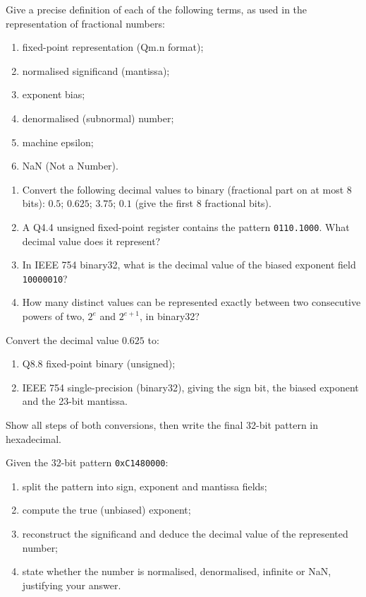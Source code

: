 \documentclass[11pt]{article}
\newcounter{popsec}
\newcounter{popsub}
\newcommand{\courssub}[1]{%
  \stepcounter{popsub}%
  \par\vspace{9pt}\noindent{\popxbold\fontsize{11.5}{13}\selectfont\color{popink}{\color{poporange}\thepopsec.\thepopsub}\hspace{6pt}#1}\par\nopagebreak\vspace{4pt}
}
\begin{document}
\begin{exercice}
Give a precise definition of each of the following terms, as used in the representation of fractional numbers:
\begin{enumerate}
\item fixed-point representation (Qm.n format);
\item normalised significand (mantissa);
\item exponent bias;
\item denormalised (subnormal) number;
\item machine epsilon;
\item NaN (Not a Number).
\end{enumerate}
\end{exercice}

\begin{exercice}
\begin{enumerate}
\item Convert the following decimal values to binary (fractional part on at most 8 bits): $0.5$; $0.625$; $3.75$; $0.1$ (give the first 8 fractional bits).
\item A Q4.4 unsigned fixed-point register contains the pattern \texttt{0110.1000}. What decimal value does it represent?
\item In IEEE 754 binary32, what is the decimal value of the biased exponent field \texttt{10000010}?
\item How many distinct values can be represented exactly between two consecutive powers of two, $2^e$ and $2^{e+1}$, in binary32?
\end{enumerate}
\end{exercice}

\courssub{I practise}

\begin{exercice}
Convert the decimal value $0.625$ to:
\begin{enumerate}
\item Q8.8 fixed-point binary (unsigned);
\item IEEE 754 single-precision (binary32), giving the sign bit, the biased exponent and the 23-bit mantissa.
\end{enumerate}
Show all steps of both conversions, then write the final 32-bit pattern in hexadecimal.
\end{exercice}

\begin{exercice}
Given the 32-bit pattern \texttt{0xC1480000}:
\begin{enumerate}
\item split the pattern into sign, exponent and mantissa fields;
\item compute the true (unbiased) exponent;
\item reconstruct the significand and deduce the decimal value of the represented number;
\item state whether the number is normalised, denormalised, infinite or NaN, justifying your answer.
\end{enumerate}
\end{exercice}
\end{document}
